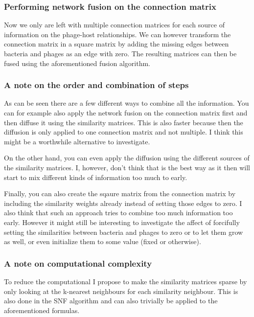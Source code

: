 \documentclass{article}
\begin{document}
\subsubsection{Performing network fusion on the connection matrix}

Now we only are left with multiple connection matrices for each source of 
information on the phage-host relationships. We can however transform the
connection matrix in a square matrix by adding the missing edges between
bacteria and phages as an edge with zero. The resulting matrices can then
be fused using the aforementioned fusion algorithm.

\subsubsection{A note on the order and combination of steps}

As can be seen there are a few different ways to combine all the information.
You can for example also apply the network fusion on the connection matrix
first and then diffuse it using the similarity matrices. This is also 
faster because then the diffusion is only applied to one connection matrix
and not multiple. I think this might be a worthwhile alternative to investigate.

On the other hand, you can even apply the diffusion
using the different sources of the similarity matrices. I, however, don't
think that is the best way as it then will start to mix different kinds 
of information too much to early.

Finally, you can
also create the sqaure matrix from the connection matrix by including the
similarity weights already instead of setting those edges to zero. I also 
think that such an approach tries to combine too much information too early.
However it might still be interesting to investigate the affect of
forcifully setting the similarities between bacteria and phages to zero 
or to let them grow as well, or even initialize them to some value (fixed
or otherwise).

\subsubsection{A note on computational complexity}

To reduce the computational I propose to make the similarity matrices sparse by only
looking at the k-nearest neighbours for each similarity neighbour.
This is also done in the SNF algorithm and can also trivially be applied 
to the aforementioned formulas.
\end{document}
